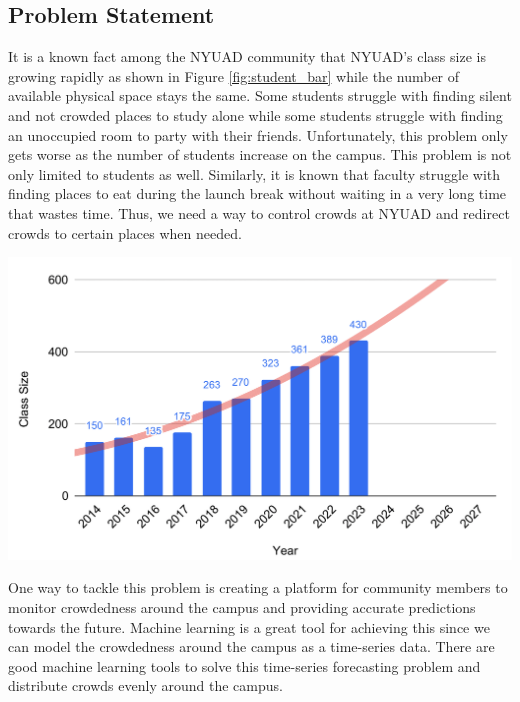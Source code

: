 \documentclass[journal, 12pt]{IEEEtran}
\begin{document}
\subsection{Problem Statement}
\noindent It is a known fact among the NYUAD community that NYUAD’s class size is growing rapidly as shown in Figure \ref{fig:student_bar} while the number of available physical space stays the same. Some students struggle with finding silent and not crowded places to study alone while some students struggle with finding an unoccupied room to party with their friends. Unfortunately, this problem only gets worse as the number of students increase on the campus. This problem is not only limited to students as well. Similarly, it is known that faculty struggle with finding places to eat during the launch break without waiting in a very long time that wastes time. Thus, we need a way to control crowds at NYUAD and redirect crowds to certain places when needed.

\begingroup
    \center
    \medskip
    \includegraphics[width=\columnwidth]{report/final_report/images/student_bar.png}
    \label{fig:student_bar}
    \medskip
\endgroup

\noindent One way to tackle this problem is creating a platform for community members to monitor crowdedness around the campus and providing accurate predictions towards the future. Machine learning is a great tool for achieving this since we can model the crowdedness around the campus as a time-series data. There are good machine learning tools to solve this time-series forecasting problem and distribute crowds evenly around the campus.\\
\end{document}
